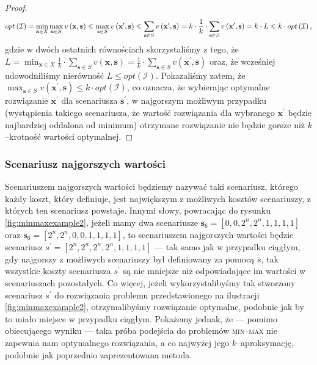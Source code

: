 \begin{proof}
	\begin{eqnarray}
		opt \left( \mathcal{I} \right) = \min_{ \mathclap{\textbf{x} \in X}} \max_{\textbf{s} \in S} v \left( \textbf{x}, \textbf{s} \right) \leqslant \max_{\textbf{s} \in S} v \left( \textbf{x}^{\prime}, \textbf{s} \right) \leqslant \sum_{\textbf{s} \in S} v \left( \textbf{x}^{\prime}, \textbf{s} \right) = k \cdot \frac{1}{k} \cdot \sum_{\textbf{s} \in S} v \left( \textbf{x}^{\prime}, \textbf{s} \right) = k \cdot L \leqslant k \cdot opt \left( \mathcal{I} \right)\text{,}
	\end{eqnarray}
	gdzie w dwóch ostatnich równościach skorzystaliśmy z tego, że $L = \min_{ \textbf{x} \in X} \frac{1}{k} \cdot \sum_{\textbf{s} \in S} v \left( \textbf{x}, \textbf{s} \right) = \frac{1}{k} \cdot \sum_{\textbf{s} \in S} v \left( \textbf{x}^{\prime}, \textbf{s} \right)$ oraz, że wcześniej udowodniliśmy nierówność $L \leqslant opt \left( \mathcal{I} \right)$. Pokazaliśmy zatem, że $\max_{\textbf{s} \in S} v \left( \textbf{x}^{\prime}, \textbf{s} \right) \leqslant k \cdot opt \left( \mathcal{I} \right)$, co oznacza, że wybierając optymalne rozwiązanie $\textbf{x}^{\prime}$ dla scenariusza $\textbf{s}^{\prime}$, w najgorszym możliwym przypadku (wystąpienia takiego scenariusza, że wartość rozwiązania dla wybranego $\textbf{x}^{\prime}$ będzie najbardziej oddalona od minimum) otrzymane rozwiązanie nie będzie gorsze niż $k$--krotność wartości optymalnej.
\end{proof}

\subsubsection{Scenariusz najgorszych wartości}

Scenariuszem najgorszych wartości będziemy nazywać taki scenariusz, którego każdy koszt, który definiuje, jest największym z możliwych kosztów scenariuszy, z których ten scenariusz powstaje. Innymi słowy, powracając do rysunku \ref{fig:minmaxexample2}, jeżeli mamy dwa scenariusze $\textbf{s}_{6} = \left[ 0, 0, 2^{n}, 2^{n}, 1, 1, 1, 1 \right]$ oraz $\textbf{s}_{6} = \left[ 2^{n}, 2^{n}, 0, 0, 1, 1, 1, 1 \right]$, to scenariuszem najgorszych wartości będzie scenariusz $s^{\prime} = \left[ 2^{n}, 2^{n}, 2^{n}, 2^{n}, 1, 1, 1, 1 \right]$ --- tak samo jak w przypadku ciągłym, gdy najgorszy z możliwych scenariuszy był definiowany za pomocą $\overline{s}$, tak wszystkie koszty scenariusza $s^{\prime}$ są nie mniejsze niż odpowiadające im wartości w scenariuszach pozostałych. Co więcej, jeżeli wykorzystalibyśmy tak stworzony scenariusz $s^{\prime}$ do rozwiązania problemu przedstawionego na ilustracji \ref{fig:minmaxexample2}, otrzymalibyśmy rozwiązanie optymalne, podobnie jak by to miało miejsce w przypadku ciągłym. Pokażemy jednak, że --- pomimo obiecującego wyniku --- taka próba podejścia do problemów \textsc{min--max} nie zapewnia nam optymalnego rozwiązania, a co najwyżej jego $k$--aproksymację, podobnie jak poprzednio zaprezentowana metoda.

